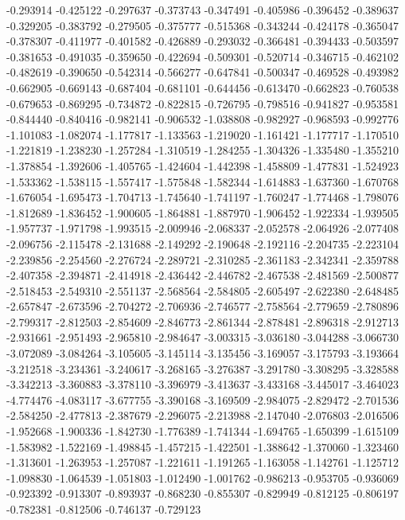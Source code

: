 -0.293914
-0.425122
-0.297637
-0.373743
-0.347491
-0.405986
-0.396452
-0.389637
-0.329205
-0.383792
-0.279505
-0.375777
-0.515368
-0.343244
-0.424178
-0.365047
-0.378307
-0.411977
-0.401582
-0.426889
-0.293032
-0.366481
-0.394433
-0.503597
-0.381653
-0.491035
-0.359650
-0.422694
-0.509301
-0.520714
-0.346715
-0.462102
-0.482619
-0.390650
-0.542314
-0.566277
-0.647841
-0.500347
-0.469528
-0.493982
-0.662905
-0.669143
-0.687404
-0.681101
-0.644456
-0.613470
-0.662823
-0.760538
-0.679653
-0.869295
-0.734872
-0.822815
-0.726795
-0.798516
-0.941827
-0.953581
-0.844440
-0.840416
-0.982141
-0.906532
-1.038808
-0.982927
-0.968593
-0.992776
-1.101083
-1.082074
-1.177817
-1.133563
-1.219020
-1.161421
-1.177717
-1.170510
-1.221819
-1.238230
-1.257284
-1.310519
-1.284255
-1.304326
-1.335480
-1.355210
-1.378854
-1.392606
-1.405765
-1.424604
-1.442398
-1.458809
-1.477831
-1.524923
-1.533362
-1.538115
-1.557417
-1.575848
-1.582344
-1.614883
-1.637360
-1.670768
-1.676054
-1.695473
-1.704713
-1.745640
-1.741197
-1.760247
-1.774468
-1.798076
-1.812689
-1.836452
-1.900605
-1.864881
-1.887970
-1.906452
-1.922334
-1.939505
-1.957737
-1.971798
-1.993515
-2.009946
-2.068337
-2.052578
-2.064926
-2.077408
-2.096756
-2.115478
-2.131688
-2.149292
-2.190648
-2.192116
-2.204735
-2.223104
-2.239856
-2.254560
-2.276724
-2.289721
-2.310285
-2.361183
-2.342341
-2.359788
-2.407358
-2.394871
-2.414918
-2.436442
-2.446782
-2.467538
-2.481569
-2.500877
-2.518453
-2.549310
-2.551137
-2.568564
-2.584805
-2.605497
-2.622380
-2.648485
-2.657847
-2.673596
-2.704272
-2.706936
-2.746577
-2.758564
-2.779659
-2.780896
-2.799317
-2.812503
-2.854609
-2.846773
-2.861344
-2.878481
-2.896318
-2.912713
-2.931661
-2.951493
-2.965810
-2.984647
-3.003315
-3.036180
-3.044288
-3.066730
-3.072089
-3.084264
-3.105605
-3.145114
-3.135456
-3.169057
-3.175793
-3.193664
-3.212518
-3.234361
-3.240617
-3.268165
-3.276387
-3.291780
-3.308295
-3.328588
-3.342213
-3.360883
-3.378110
-3.396979
-3.413637
-3.433168
-3.445017
-3.464023
-4.774476
-4.083117
-3.677755
-3.390168
-3.169509
-2.984075
-2.829472
-2.701536
-2.584250
-2.477813
-2.387679
-2.296075
-2.213988
-2.147040
-2.076803
-2.016506
-1.952668
-1.900336
-1.842730
-1.776389
-1.741344
-1.694765
-1.650399
-1.615109
-1.583982
-1.522169
-1.498845
-1.457215
-1.422501
-1.388642
-1.370060
-1.323460
-1.313601
-1.263953
-1.257087
-1.221611
-1.191265
-1.163058
-1.142761
-1.125712
-1.098830
-1.064539
-1.051803
-1.012490
-1.001762
-0.986213
-0.953705
-0.936069
-0.923392
-0.913307
-0.893937
-0.868230
-0.855307
-0.829949
-0.812125
-0.806197
-0.782381
-0.812506
-0.746137
-0.729123
